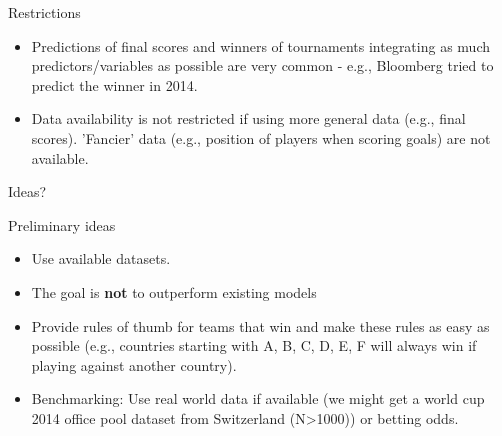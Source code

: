 \documentclass[10pt]{beamer}
\begin{document}


\begin{frame}[fragile]{Restrictions}

\begin{itemize}
\item Predictions of final scores and winners of tournaments integrating as much predictors/variables as possible are very common - e.g.,  Bloomberg tried to predict the winner in 2014. 
\item Data availability is not restricted if using more general data (e.g., final scores). 'Fancier' data (e.g., position of players when scoring goals) are not available. 
\end{itemize}
\end{frame}


{
\begin{frame}[standout]
  Ideas?
\end{frame}
}

\begin{frame}[fragile]{Preliminary ideas}

\begin{itemize}
\item Use available datasets. 
\item The goal is \textbf{not} to outperform existing models
\item Provide rules of thumb for teams that win and make these rules as easy as possible (e.g., countries starting with A, B, C, D, E, F will always win if playing against another country).
\item Benchmarking: Use real world data if available (we might get a world cup 2014 office pool dataset from Switzerland (N>1000)) or betting odds.
\end{itemize}

\end{frame}
\end{document}
